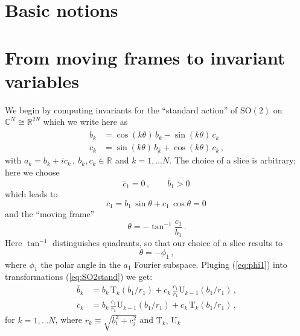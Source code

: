 \documentclass[aip,cha,showpacs,twocolumn, 
 		  reprint]{revtex4-1} %
\newcommand{\beq}{\begin{equation}}
\newcommand{\eeq}{\end{equation}}
\newcommand{\bseq}{\begin{subequations}}
\newcommand{\eseq}{\end{subequations}}
\newcommand{\barr}{\begin{array}}
\newcommand{\earr}{\end{array}}
\newcommand{\refeq}  [1] {(\ref{#1})}
\newcommand{\Rls}[1]{\ensuremath{\mathbb{R}^{#1}}}
\newcommand{\Clx}[1]{\ensuremath{\mathbb{C}^{#1}}}
\newcommand{\SOn}[1]{\ensuremath{\textrm{SO}(#1)}}         %
\newcommand{\chebT}{\mathrm{T}}
\newcommand{\chebU}{\mathrm{U}}
\begin{document}
\section{Basic notions\label{s:notions}}

\section{From moving frames to invariant variables}

We begin by computing invariants for the ``standard action''
of $\SOn{2}$ on $\Clx{N}\cong\Rls{2N}$
which we write here as
\bseq\label{eq:SO2stand}
  \begin{align}
	  \overline{b}_k &= \cos(k\theta)\,b_k - \sin(k\theta)\,c_k\,\label{eq:SO2stand1}\\
	  \overline{c}_k &= \sin(k\theta)\,b_k + \cos(k\theta)\,c_k\,,\label{eq:SO2stand2}
  \end{align}
\eseq
with $a_k=b_k+i c_k\,,\ b_k,c_k\in\Rls{}$ and $k=1,\ldots N$.
The choice of a slice is arbitrary; here we choose
\beq
 	\overline{c}_1=0\,,\qquad \overline{b}_1>0\,
\eeq
which leads to
\beq
	\overline{c}_1 = b_1\,\sin\theta + c_1\,\cos\theta  = 0\,
	\label{eq:SO2norm}
\eeq
and the ``moving frame''
\beq
	\theta=-\tan^{-1}\frac{c_1}{b_1}\,.
	\label{eq:SO2mf}
\eeq
Here $\tan^{-1}$ distinguishes quadrants, so that our choice of a slice
results to 
\beq\label{eq:phi1}
  \theta=-\phi_1\,,
\eeq
where $\phi_1$ the polar angle in the $a_1$ Fourier
subspace. Pluging \refeq{eq:phi1} into
transformations \refeq{eq:SO2stand} we get:
\bseq\label{eq:SO2cheb}
  \begin{align}
    \overline{b}_k &= 
		    b_k\, \chebT_k\left(b_1/r_1\right)+
		    c_k\,\frac{c_1}{r_1} \chebU_{k-1}\left(b_1/r_1\right)\,, \label{eq:SO2cheb1}\\
    \overline{c}_k &=
		    b_k\, \frac{c_1}{r_1} \chebU_{k-1}\left(b_1/r_1\right)+
		    c_k\,\chebT_k\left(b_1/r_1\right)\,,  \label{eq:SO2cheb2}
  \end{align}
\eseq
for $k=1,\ldots N$, where $r_k\equiv\sqrt{b_i^2+c_i^2}$ and $\chebT_k,\,\chebU_k$
\end{document}
